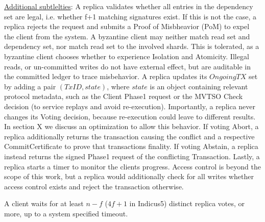 \underline{Additional subtlelties}: A replica validates whether all entries in the dependency set are legal, i.e. whether f+1 matching signatures exist. If this is not the case, a replica rejects the request and submits a Proof of Misbheavior (PoM) to expel the client from the system. A byzantine client may neither match read set and dependency set, nor match read set to the involved shards. This is tolerated, as a byzantine client chooses whether to experience Isolation and Atomicity. Illegal reads, or un-committed writes do not have external effect, but are auditable in the committed ledger to trace misbehavior. 
A replica updates its $OngoingTX$ set by adding a pair $(TxID, state)$, where $state$ is an object containing relevant protocol metadata, such as the Client Phase1 request or the MVTSO Check decision (to service replays and avoid re-execution). Importantly, a replica never changes its Voting decision, because re-execution could leave to different results. In section X we discuss an optimization to allow this behavior. If voting Abort, a replica additionally returns the transaction causing the conflict and a respective CommitCertificate to prove that transactions finality. If voting Abstain, a replica instead returns the signed Phase1 request of the conflicting Transaction.  
Lastly, a replica starts a timer to monitor the clients progress.
Access control is beyond the scope of this work, but a replica would additionally check for all writes whether access control exists and reject the transaction otherwise.


A client waits for at least $n-f$ ($4f+1$ in Indicus5) distinct replica votes, or more, up to a system specified timeout. 

